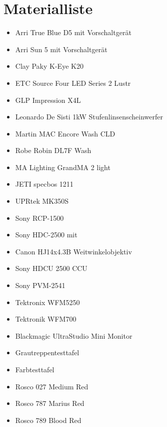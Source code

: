 \section{Materialliste}

\begin{itemize}
\item Arri True Blue D5 mit Vorschaltgerät
\item Arri Sun 5 mit Vorschaltgerät
\item Clay Paky K-Eye K20
\item ETC Source Four LED Series 2 Lustr
\item GLP Impression X4L
\item Leonardo De Sisti 1kW Stufenlinsenscheinwerfer
\item Martin MAC Encore Wash CLD
\item Robe Robin DL7F Wash
\item MA Lighting GrandMA 2 light
\item JETI specbos 1211
\item UPRtek MK350S
\item Sony RCP-1500
\item Sony HDC-2500 mit 
\item Canon HJ14x4.3B Weitwinkelobjektiv
\item Sony HDCU 2500 CCU
\item Sony PVM-2541
\item Tektronix WFM5250 
\item Tektronik WFM700
\item Blackmagic UltraStudio Mini Monitor
\item Grautreppentesttafel
\item Farbtesttafel
\item Rosco 027 \glqq Medium Red\grqq\
\item Rosco 787 \glqq Marius Red\grqq\
\item Rosco 789 \glqq Blood Red\grqq\
\end{itemize}

%

